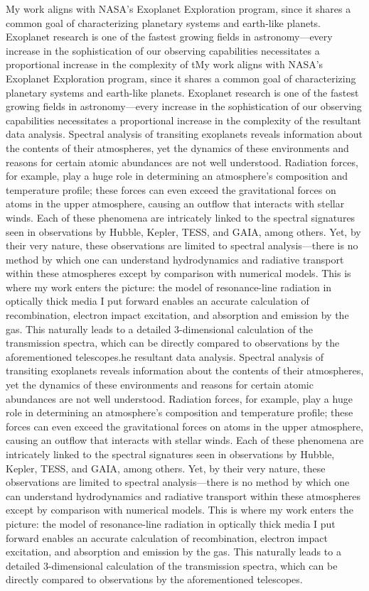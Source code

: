 My work aligns with NASA's Exoplanet Exploration program, since it shares a common goal of characterizing planetary systems and earth-like planets. Exoplanet research is one of the fastest growing fields in astronomy---every increase in the sophistication of our observing capabilities necessitates a proportional increase in the complexity of tMy work aligns with NASA's Exoplanet Exploration program, since it shares a common goal of characterizing planetary systems and earth-like planets. Exoplanet research is one of the fastest growing fields in astronomy---every increase in the sophistication of our observing capabilities necessitates a proportional increase in the complexity of the resultant data analysis. Spectral analysis of transiting exoplanets reveals information about the contents of their atmospheres, yet the dynamics of these environments and reasons for certain atomic abundances are not well understood. Radiation forces, for example, play a huge role in determining an atmosphere's composition and temperature profile; these forces can even exceed the gravitational forces on atoms in the upper atmosphere, causing an outflow that interacts with stellar winds. Each of these phenomena are intricately linked to the spectral signatures seen in observations by Hubble, Kepler, TESS, and GAIA, among others. Yet, by their very nature, these observations are limited to spectral analysis---there is no method by which one can understand hydrodynamics and radiative transport within these atmospheres except by comparison with numerical models. This is where my work enters the picture: the model of resonance-line radiation in optically thick media I put forward enables an accurate calculation of recombination, electron impact excitation, and absorption and emission by the gas. This naturally leads to a detailed 3-dimensional calculation of the transmission spectra, which can be directly compared to observations by the aforementioned telescopes.he resultant data analysis. Spectral analysis of transiting exoplanets reveals information about the contents of their atmospheres, yet the dynamics of these environments and reasons for certain atomic abundances are not well understood. Radiation forces, for example, play a huge role in determining an atmosphere's composition and temperature profile; these forces can even exceed the gravitational forces on atoms in the upper atmosphere, causing an outflow that interacts with stellar winds. Each of these phenomena are intricately linked to the spectral signatures seen in observations by Hubble, Kepler, TESS, and GAIA, among others. Yet, by their very nature, these observations are limited to spectral analysis---there is no method by which one can understand hydrodynamics and radiative transport within these atmospheres except by comparison with numerical models. This is where my work enters the picture: the model of resonance-line radiation in optically thick media I put forward enables an accurate calculation of recombination, electron impact excitation, and absorption and emission by the gas. This naturally leads to a detailed 3-dimensional calculation of the transmission spectra, which can be directly compared to observations by the aforementioned telescopes.

